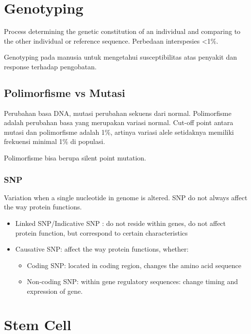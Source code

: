 \documentclass[
  letterpaper,
  DIV=11,
  numbers=noendperiod]{scrreprt}
\providecommand{\tightlist}{%
  \setlength{\itemsep}{0pt}\setlength{\parskip}{0pt}}\usepackage{longtable,booktabs,array}
\begin{document}
\section{Genotyping}\label{genotyping}

Process determining the genetic constitution of an individual and
comparing to the other individual or reference sequence. Perbedaan
interspesies \textless1\%.

Genotyping pada manusia untuk mengetahui susceptibilitas atas penyakit
dan response terhadap pengobatan.

\subsection{Polimorfisme vs Mutasi}\label{polimorfisme-vs-mutasi}

Perubahan basa DNA, mutasi perubahan sekuens dari normal. Polimorfisme
adalah perubahan basa yang merupakan variasi normal. Cut-off point
antara mutasi dan polimorfisme adalah 1\%, artinya variasi alele
setidaknya memiliki frekuensi minimal 1\% di populasi.

Polimorfisme bisa berupa silent point mutation.

\subsubsection{SNP}\label{snp}

Variation when a single nucleotide in genome is altered. SNP do not
always affect the way protein functions.

\begin{itemize}
\tightlist
\item
  Linked SNP/Indicative SNP : do not reside within genes, do not affect
  protein function, but correspond to certain characteristics
\item
  Causative SNP: affect the way protein functions, whether:

  \begin{itemize}
  \tightlist
  \item
    Coding SNP: located in coding region, changes the amino acid
    sequence
  \item
    Non-coding SNP: within gene regulatory sequences: change timing and
    expression of gene.
  \end{itemize}
\end{itemize}

\section{Stem Cell}\label{stem-cell}
\end{document}
